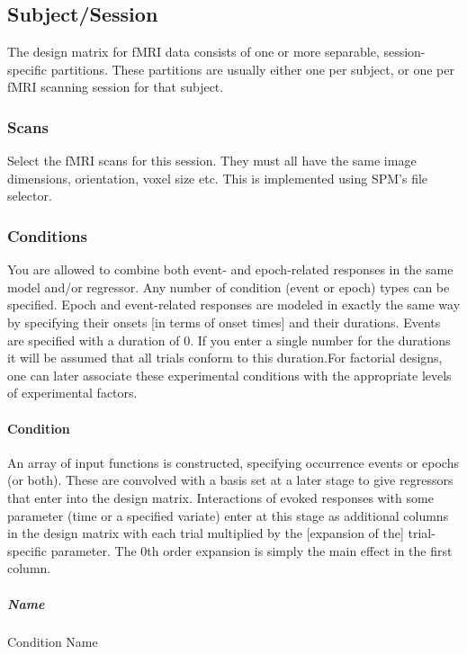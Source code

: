 \subsection{Subject/Session}

The design matrix for fMRI data consists of one or more separable, session-specific partitions.  These partitions are usually either one per subject, or one per fMRI scanning session for that subject.

\subsubsection{Scans}

Select the fMRI scans for this session.  They must all have the same image dimensions, orientation, voxel size etc. This is implemented using SPM's file selector.

\subsubsection{Conditions}

You are allowed to combine both event- and epoch-related responses in the same model and/or regressor. Any number of condition (event or epoch) types can be specified.  Epoch and event-related responses are modeled in exactly the same way by specifying their onsets [in terms of onset times] and their durations.  Events are specified with a duration of 0.  If you enter a single number for the durations it will be assumed that all trials conform to this duration.For factorial designs, one can later associate these experimental conditions with the appropriate levels of experimental factors. 

\paragraph{Condition}

An array of input functions is constructed, specifying occurrence events or epochs (or both). These are convolved with a basis set at a later stage to give regressors that enter into the design matrix. Interactions of evoked responses with some parameter (time or a specified variate) enter at this stage as additional columns in the design matrix with each trial multiplied by the [expansion of the] trial-specific parameter. The 0th order expansion is simply the main effect in the first column.

\subparagraph{Name}

Condition Name

